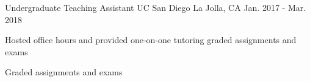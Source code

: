\begin{cventries}

  \cventry
    {Undergraduate Teaching Assistant} %
    {UC San Diego} %
    {La Jolla, CA} %
    {Jan. 2017 - Mar. 2018} %
    {
      \begin{cvitems} %
        \item {Hosted office hours and provided one-on-one tutoring graded assignments and exams}
        \item {Graded assignments and exams}
      \end{cvitems}
    }


\end{cventries}
